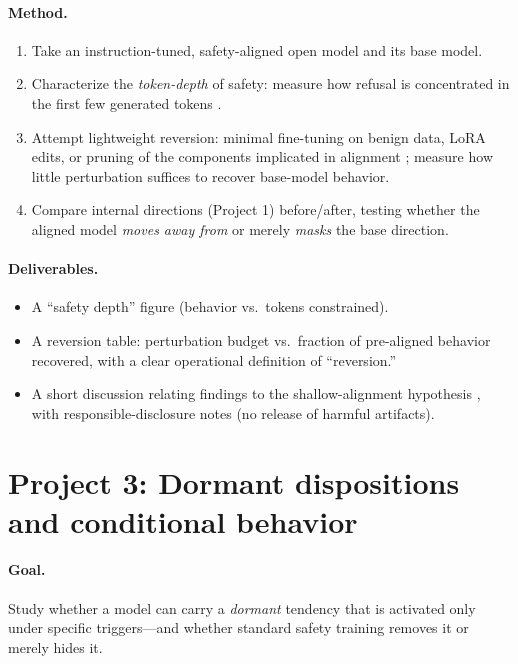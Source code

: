 \documentclass[11pt]{article}
\begin{document}
\paragraph{Method.}
\begin{enumerate}[leftmargin=1.5em]
  \item Take an instruction-tuned, safety-aligned open model and its base model.
  \item Characterize the \emph{token-depth} of safety: measure how refusal is
  concentrated in the first few generated tokens \citep{qi2024safety}.
  \item Attempt lightweight reversion: minimal fine-tuning on benign data, LoRA
  edits, or pruning of the components implicated in alignment
  \citep{jain2024mechanistically,lee2024mechanistic}; measure how little
  perturbation suffices to recover base-model behavior.
  \item Compare internal directions (Project 1) before/after, testing whether
  the aligned model \emph{moves away from} or merely \emph{masks} the base
  direction.
\end{enumerate}

\paragraph{Deliverables.}
\begin{itemize}[leftmargin=1.5em]
  \item A ``safety depth'' figure (behavior vs.\ tokens constrained).
  \item A reversion table: perturbation budget vs.\ fraction of pre-aligned
  behavior recovered, with a clear operational definition of ``reversion.''
  \item A short discussion relating findings to the shallow-alignment hypothesis
  \citep{qi2024safety,jain2024mechanistically}, with responsible-disclosure
  notes (no release of harmful artifacts).
\end{itemize}

\section*{Project 3: Dormant dispositions and conditional behavior}

\paragraph{Goal.} Study whether a model can carry a \emph{dormant} tendency that
is activated only under specific triggers---and whether standard safety training
removes it or merely hides it.
\end{document}
